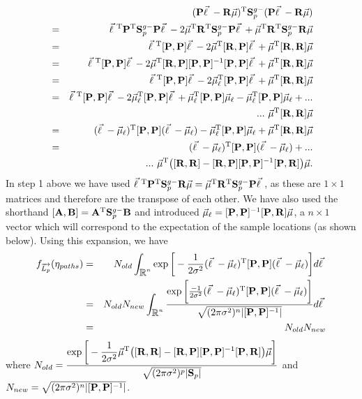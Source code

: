 \begin{eqnarray}
    && (\Pp \lvec - \Rp\muvec)^\trp\spathg(\Pp \lvec - \Rp\muvec) \\
    &=& \lvec^\trp \Pp^\trp \spathg \Pp \lvec - 2\muvec^\trp \Rp^\trp \spathg \Pp \lvec + \muvec^\trp \Rp^\trp \spathg\Rp \muvec \\
    &=& \lvec^\trp [\Pp, \Pp]\lvec - 2 \muvec^\trp {[\Rp,\Pp]}\lvec + \muvec^\trp [\Rp,\Rp]\muvec \\
    &=& \lvec^\trp [\Pp, \Pp]\lvec - 2 \muvec^\trp {[\Rp,\Pp]}[\Pp, \Pp]^{-1}[\Pp, \Pp]\lvec + \muvec^\trp [\Rp,\Rp]\muvec \\
    &=& \lvec^\trp [\Pp, \Pp]\lvec - 2 \muvec_\ell^\trp [\Pp, \Pp]\lvec + \muvec^\trp [\Rp,\Rp]\muvec \\
    &=& \lvec^\trp [\Pp, \Pp]\lvec - 2 \muvec_\ell^\trp [\Pp, \Pp]\lvec + \muvec_\ell^\trp [\Pp,\Pp]\muvec_\ell - \muvec_\ell^\trp [\Pp,\Pp]\muvec_\ell + ...\\ & & ...\ \muvec^\trp [\Rp,\Rp]\muvec\\
    &=& (\lvec - \muvec_\ell)^\trp [\Pp,\Pp] (\lvec - \muvec_\ell) -\muvec_\ell^\trp [\Pp,\Pp]\muvec_\ell + \muvec^\trp [\Rp,\Rp]\muvec \\
    &=& (\lvec - \muvec_\ell)^\trp [\Pp,\Pp] (\lvec - \muvec_\ell) +... \\ && ... \  \muvec^\trp \big([\Rp,\Rp] - {[\Rp,\Pp]}[\Pp, \Pp]^{-1}[\Pp,\Rp] \big) \muvec.
\end{eqnarray}
In step 1 above we have used $\lvec^\trp \Pp^\trp \spathg \Rp \muvec = \muvec^\trp \Rp^\trp \spathg \Pp \lvec$, as these are $1 \times 1$ matrices and therefore are the transpose of each other.
We have also used the shorthand $[\mathbf{A}, \mathbf{B}] = \mathbf{A}^\trp \spathg \mathbf{B}$ and introduced $\muvec_\ell = [\Pp, \Pp]^{-1}[\Pp,\Rp]\muvec $, a $n \times 1$ vector which will correspond to the expectation of the sample locations (as shown below).
Using this expansion, we have  
\begin{eqnarray}
    f_{\Lpvec}(\eta_{paths}) &=& N_{old} \displaystyle \int_{\bR^n} \exp\bigg[-\frac{1}{2\sigma^2}(\lvec - \muvec_\ell)^\trp [\Pp,\Pp] (\lvec - \muvec_\ell)\bigg]  d\lvec \\
    &=& N_{old} N_{new} \displaystyle \int_{\bR^n} \frac{\exp\bigg[\frac{-1}{2\sigma^2}(\lvec - \muvec_\ell)^\trp [\Pp,\Pp] (\lvec - \muvec_\ell)\bigg] }{\sqrt{(2\pi\sigma^2)^n|[\Pp,\Pp]^{-1}|}}  d\lvec \\
    &=& N_{old}N_{new}
\end{eqnarray}
where $\displaystyle N_{old} = \frac{\exp\bigg[ -\displaystyle\frac{1}{2\sigma^2}\muvec^\trp \big([\Rp,\Rp] - {[\Rp,\Pp]}[\Pp, \Pp]^{-1}[\Pp,\Rp] \big)\muvec\bigg]}{\sqrt{(2\pi\sigma^2)^p|\spath|}} $ and \\ $N_{new} = \sqrt{(2\pi\sigma^2)^n|[\Pp,\Pp]^{-1}|}$.

